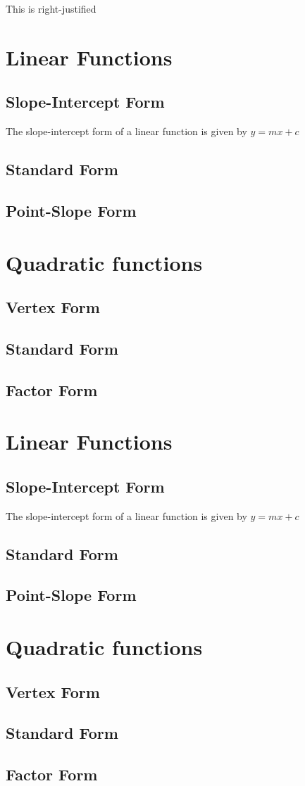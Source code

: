 \documentclass[11pt]{article}
\begin{document}
\begin{flushright}
This is right-justified
\end{flushright}


\section{Linear Functions}
	\subsection{Slope-Intercept Form}
	The slope-intercept form of a linear function is given by $y=mx + c $
	\subsection{Standard Form}
	\subsection{Point-Slope Form}
	

\section{Quadratic functions}
	\subsection{Vertex Form}
	\subsection{Standard Form}
	\subsection{Factor Form}

\section*{Linear Functions}
	\subsection*{Slope-Intercept Form}
	The slope-intercept form of a linear function is given by $y=mx + c $
	\subsection*{Standard Form}
	\subsection*{Point-Slope Form}
	
\section*{Quadratic functions}
	\subsection*{Vertex Form}
	\subsection*{Standard Form}
	\subsection*{Factor Form}
\end{document}
